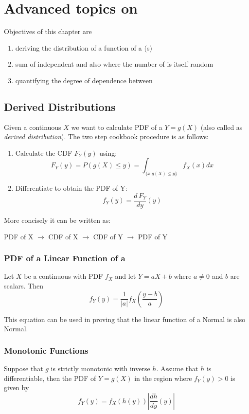 \chapter{Advanced topics on \RV}

Objectives of this chapter are
\begin{enumerate}
    \item deriving the distribution of a function of a \rv(s)
    \item sum of independent \rv and also where the number of \rv is itself random
    \item quantifying the degree of dependence between \rv
\end{enumerate}

\section{Derived Distributions}
Given a continuous \rv $X$ we want to calculate PDF of a \rv $Y=g(X)$ (also called as \textit{derived distribution}). The two step cookbook procedure is as follows:
\begin{enumerate}
    \item Calculate the CDF $F_Y(y)$ using:
    \[F_Y(y)=P(g(X)\le y)=\int_{\{x|g(X)\le y\}}f_X(x) dx\]
    \item Differentiate to obtain the PDF of Y:
    \[f_Y(y)=\frac{d \, F_Y}{dy}(y)\]
\end{enumerate}
More concisely it can be written as:
\begin{center}
    PDF of X $\to$ CDF of X $\to$ CDF of Y $\to$ PDF of Y
\end{center}

\subsection{PDF of a Linear Function of a \RV}
Let $X$ be a continuous \rv with PDF $f_X$ and let $Y=aX+b$ where $a \neq 0$ and $b$ are scalars. Then
\[\boxed{f_Y(y)=\frac{1}{|a|}f_X\left( \frac{y-b}{a}\right)}\]

\begin{remark}
    This equation can be used in proving that the linear function of a Normal \RV is also Normal.
\end{remark}

\subsection{Monotonic Functions}
Suppose that $g$ is strictly monotonic with inverse $h$. Assume that $h$ is differentiable, then the PDF of $Y =g(X)$ in the region where $f_Y(y)>0$ is given by
\[\boxed{f_Y(y)=f_X(h(y)) \left| \frac{dh}{dy}(y) \right|}\]

